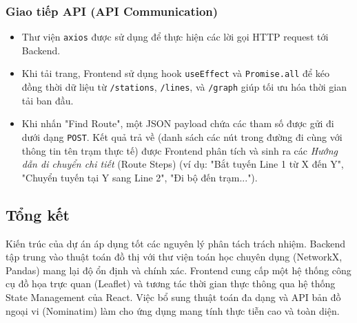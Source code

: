 \documentclass[12pt,a4paper]{article}
\begin{document}
\subsubsection{Giao tiếp API (API Communication)}
\begin{itemize}
    \item Thư viện \texttt{axios} được sử dụng để thực hiện các lời gọi HTTP request tới Backend.
    \item Khi tải trang, Frontend sử dụng hook \texttt{useEffect} và \texttt{Promise.all} để kéo đồng thời dữ liệu từ \texttt{/stations}, \texttt{/lines}, và \texttt{/graph} giúp tối ưu hóa thời gian tải ban đầu.
    \item Khi nhấn "Find Route", một JSON payload chứa các tham số được gửi đi dưới dạng \texttt{POST}. Kết quả trả về (danh sách các nút trong đường đi cùng với thông tin tên trạm thực tế) được Frontend phân tích và sinh ra các \textit{Hướng dẫn di chuyển chi tiết} (Route Steps) (ví dụ: "Bắt tuyến Line 1 từ X đến Y", "Chuyển tuyến tại Y sang Line 2", "Đi bộ đến trạm...").
\end{itemize}

\subsection{Tổng kết}
Kiến trúc của dự án áp dụng tốt các nguyên lý phân tách trách nhiệm. Backend tập trung vào thuật toán đồ thị với thư viện toán học chuyên dụng (NetworkX, Pandas) mang lại độ ổn định và chính xác. Frontend cung cấp một hệ thống công cụ đồ họa trực quan (Leaflet) và tương tác thời gian thực thông qua hệ thống State Management của React. Việc bổ sung thuật toán đa dạng và API bản đồ ngoại vi (Nominatim) làm cho ứng dụng mang tính thực tiễn cao và toàn diện.
\end{document}

